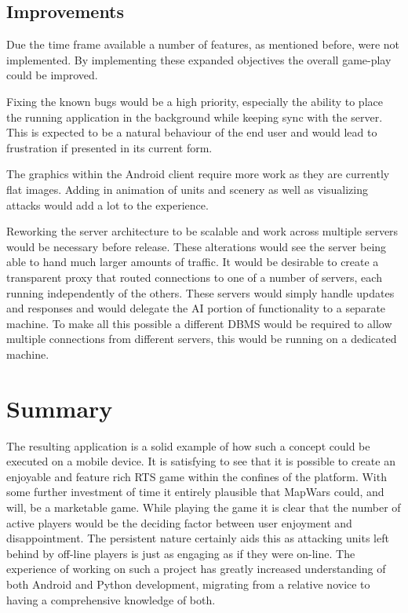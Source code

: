 \subsection{Improvements}
Due the time frame available a number of features, as mentioned before, were not implemented. By implementing these expanded objectives the overall game-play could be improved.

Fixing the known bugs would be a high priority, especially the ability to place the running application in the background while keeping sync with the server. This is expected to be a natural behaviour of the end user and would lead to frustration if presented in its current form.

The graphics within the Android client require more work as they are currently flat images. Adding in animation of units and scenery as well as visualizing attacks would add a lot to the experience.

Reworking the server architecture to be scalable and work across multiple servers would be necessary before release. These alterations would see the server being able to hand much larger amounts of traffic. It would be desirable to create a transparent proxy that routed connections to one of a number of servers, each running independently of the others. These servers would simply handle updates and responses and would delegate the AI portion of functionality to a separate machine. To make all this possible a different DBMS would be required to allow multiple connections from different servers, this would be running on a dedicated machine.

\section{Summary}
The resulting application is a solid example of how such a concept could be executed on a mobile device. It is satisfying to see that it is possible to create an enjoyable and feature rich RTS game within the confines of the platform. With some further investment of time it entirely plausible that MapWars could, and will, be a marketable game. While playing the game it is clear that the number of active players would be the deciding factor between user enjoyment and disappointment. The persistent nature certainly aids this as attacking units left behind by off-line players is just as engaging as if they were on-line. The experience of working on such a project has greatly increased understanding of both Android and Python development, migrating from a relative novice to having a comprehensive knowledge of both.
